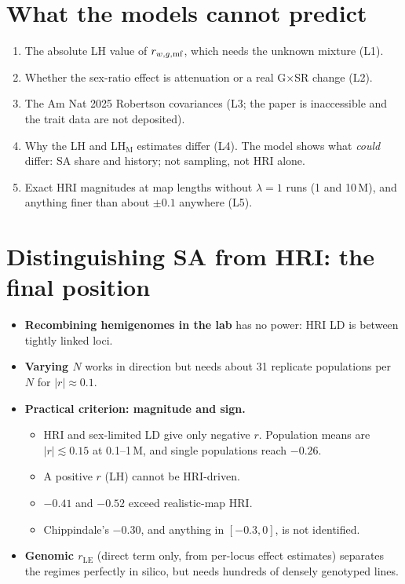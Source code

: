 \section{What the models cannot predict}
\begin{enumerate}
\item The absolute LH value of $r_{w,g,\mathrm{mf}}$, which needs the unknown mixture (L1).
\item Whether the sex-ratio effect is attenuation or a real G$\times$SR change (L2).
\item The Am Nat 2025 Robertson covariances (L3; the paper is inaccessible and the trait data are not deposited).
\item Why the LH and LH$_\mathrm{M}$ estimates differ (L4). The model shows what \emph{could} differ: SA share and history; not sampling, not HRI alone.
\item Exact HRI magnitudes at map lengths without $\lambda=1$ runs (1 and 10\,M), and anything finer than about $\pm0.1$ anywhere (L5).
\end{enumerate}

\section{Distinguishing SA from HRI: the final position \claimC}
\begin{itemize}
\item \textbf{Recombining hemigenomes in the lab} has no power: HRI LD is between tightly linked loci.
\item \textbf{Varying $N$} works in direction but needs about 31 replicate populations per $N$ for $|r|\approx0.1$.
\item \textbf{Practical criterion: magnitude and sign.}
  \begin{itemize}
  \item HRI and sex-limited LD give only negative $r$. Population means are $|r|\lesssim0.15$ at 0.1--1\,M, and single populations reach $-0.26$.
  \item A positive $r$ (LH) cannot be HRI-driven.
  \item $-0.41$ and $-0.52$ exceed realistic-map HRI.
  \item Chippindale's $-0.30$, and anything in $[-0.3,0]$, is not identified.
  \end{itemize}
\item \textbf{Genomic $r_\mathrm{LE}$} (direct term only, from per-locus effect estimates) separates the regimes perfectly in silico, but needs hundreds of densely genotyped lines.
\end{itemize}

